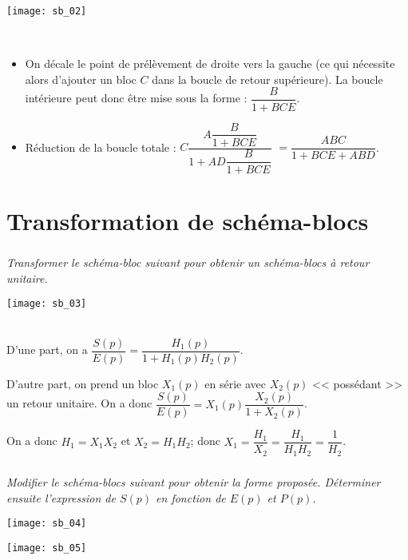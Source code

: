 \begin{multicols}{2}
\begin{center}
\texttt{[image: sb\_02]}
\end{center}

\ifprof
\begin{corrige}
~\\
\begin{itemize}
\item On décale le point de prélèvement de droite vers la gauche (ce qui nécessite alors d'ajouter un bloc $C$ dans la boucle de retour supérieure). La boucle intérieure peut donc être mise sous la forme : $\dfrac{B}{1+BCE}$.
\item Réduction de la boucle totale : $C \dfrac{A\dfrac{B}{1+BCE}}{1+AD\dfrac{B}{1+BCE}}$ $ =\dfrac{ABC}{1+BCE+ABD}$.
\end{itemize}
\end{corrige}
\else
\fi


\section*{Transformation de schéma-blocs}
\subparagraph*{}
\textit{Transformer le schéma-bloc suivant pour obtenir un schéma-blocs à retour unitaire.}
\begin{center}
\texttt{[image: sb\_03]}
\end{center}



\ifprof
\begin{corrige}
~\\
D'une part, on a $\dfrac{S(p)}{E(p)}=\dfrac{H_1(p)}{1+H_1(p)H_2(p)}$.

D'autre part, on prend un bloc $X_1(p)$ en série avec $X_2(p)$ << possédant >> un retour unitaire. On a donc 
$\dfrac{S(p)}{E(p)}=X_1(p)\dfrac{X_2(p)}{1+X_2(p)}$. 

On a donc $H_1=X_1X_2$ et $X_2=H_1H_2$; donc $X_1  = \dfrac{H_1}{X_2}=\dfrac{H_1}{H_1H_2}=\dfrac{1}{H_2}$.
\end{corrige}
\else
\fi


\subparagraph*{}
\textit{Modifier le schéma-blocs suivant pour obtenir la forme proposée. Déterminer ensuite l'expression de $S(p)$ en fonction de $E(p)$ et $P(p)$.}
\begin{center}
\texttt{[image: sb\_04]}
\end{center}

\begin{center}
\texttt{[image: sb\_05]}
\end{center}




\end{multicols}
